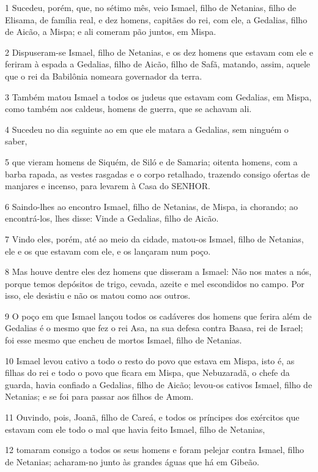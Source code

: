 \par 1 Sucedeu, porém, que, no sétimo mês, veio Ismael, filho de Netanias, filho de Elisama, de família real, e dez homens, capitães do rei, com ele, a Gedalias, filho de Aicão, a Mispa; e ali comeram pão juntos, em Mispa.
\par 2 Dispuseram-se Ismael, filho de Netanias, e os dez homens que estavam com ele e feriram à espada a Gedalias, filho de Aicão, filho de Safã, matando, assim, aquele que o rei da Babilônia nomeara governador da terra.
\par 3 Também matou Ismael a todos os judeus que estavam com Gedalias, em Mispa, como também aos caldeus, homens de guerra, que se achavam ali.
\par 4 Sucedeu no dia seguinte ao em que ele matara a Gedalias, sem ninguém o saber,
\par 5 que vieram homens de Siquém, de Siló e de Samaria; oitenta homens, com a barba rapada, as vestes rasgadas e o corpo retalhado, trazendo consigo ofertas de manjares e incenso, para levarem à Casa do SENHOR.
\par 6 Saindo-lhes ao encontro Ismael, filho de Netanias, de Mispa, ia chorando; ao encontrá-los, lhes disse: Vinde a Gedalias, filho de Aicão.
\par 7 Vindo eles, porém, até ao meio da cidade, matou-os Ismael, filho de Netanias, ele e os que estavam com ele, e os lançaram num poço.
\par 8 Mas houve dentre eles dez homens que disseram a Ismael: Não nos mates a nós, porque temos depósitos de trigo, cevada, azeite e mel escondidos no campo. Por isso, ele desistiu e não os matou como aos outros.
\par 9 O poço em que Ismael lançou todos os cadáveres dos homens que ferira além de Gedalias é o mesmo que fez o rei Asa, na sua defesa contra Baasa, rei de Israel; foi esse mesmo que encheu de mortos Ismael, filho de Netanias.
\par 10 Ismael levou cativo a todo o resto do povo que estava em Mispa, isto é, as filhas do rei e todo o povo que ficara em Mispa, que Nebuzaradã, o chefe da guarda, havia confiado a Gedalias, filho de Aicão; levou-os cativos Ismael, filho de Netanias; e se foi para passar aos filhos de Amom.
\par 11 Ouvindo, pois, Joanã, filho de Careá, e todos os príncipes dos exércitos que estavam com ele todo o mal que havia feito Ismael, filho de Netanias,
\par 12 tomaram consigo a todos os seus homens e foram pelejar contra Ismael, filho de Netanias; acharam-no junto às grandes águas que há em Gibeão.
